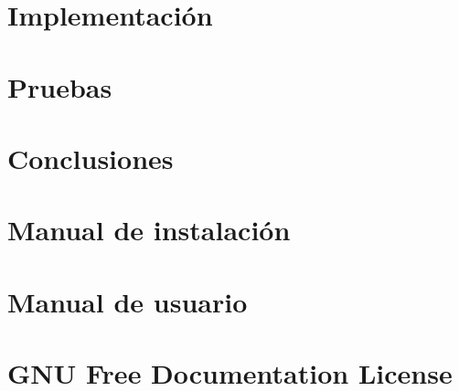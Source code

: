 \documentclass[a4paper, 12pt]{book}
\begin{document}
\chapter{Implementación}
\label{chap:implementacion}


\chapter{Pruebas}
\label{chap:pruebas}


\chapter{Conclusiones}
\label{chap:conclusiones}


\appendix

\chapter{Manual de instalación}
\label{chap:manual_instalacion}


\chapter{Manual de usuario}
\label{chap:manual_usuario}


\chapter{GNU Free Documentation License}
\label{sec:fdl}




\end{document}
